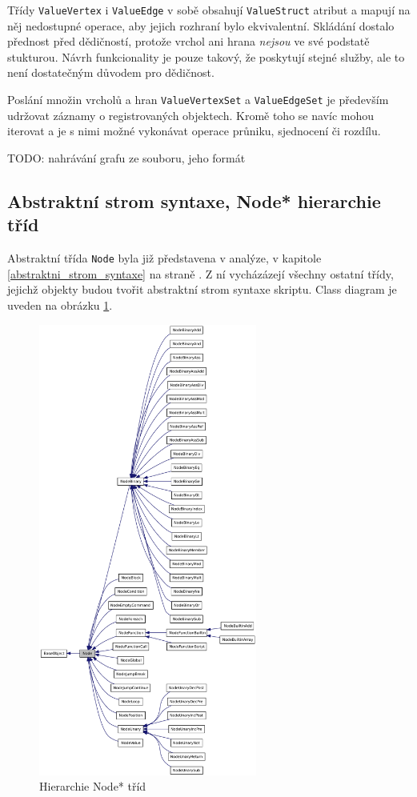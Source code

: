\documentclass[11pt,twoside,a4paper]{book}
\begin{document}
Třídy \texttt{ValueVertex} i \texttt{ValueEdge} v sobě obsahují \texttt{ValueStruct} atribut a mapují na něj nedostupné operace, aby jejich rozhraní bylo ekvivalentní. Skládání dostalo přednost před dědičností, protože vrchol ani hrana \textit{nejsou} ve své podstatě stukturou. Návrh funkcionality je pouze takový, že poskytují stejné služby, ale to není dostatečným důvodem pro dědičnost.

Poslání množin vrcholů a hran \texttt{ValueVertexSet} a \texttt{ValueEdgeSet} je především udržovat záznamy o registrovaných objektech. Kromě toho se navíc mohou iterovat a je s nimi možné vykonávat operace průniku, sjednocení či rozdílu.

TODO: nahrávání grafu ze souboru, jeho formát


\subsection{Abstraktní strom syntaxe, Node* hierarchie tříd}

Abstraktní třída \texttt{Node} byla již představena v analýze, v kapitole \ref{abstraktni_strom_syntaxe} na straně \pageref{abstraktni_strom_syntaxe}. Z ní vycházázejí všechny ostatní třídy, jejichž objekty budou tvořit abstraktní strom syntaxe skriptu. Class diagram je uveden na obrázku \ref{fig:node_hierarchy}.

\begin{figure}[ht]
\begin{center}
\includegraphics[height=14.9cm]{img/classNode__inherit__graph.pdf}
\caption{Hierarchie Node* tříd}
\label{fig:node_hierarchy}
\end{center}
\end{figure}
\end{document}
